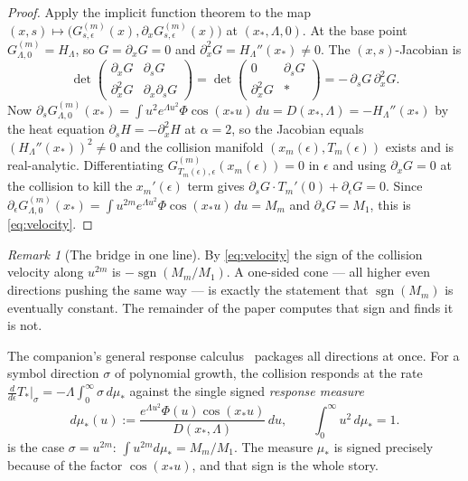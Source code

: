 \documentclass[11pt,reqno]{amsart}
\theoremstyle{plain}
\theoremstyle{definition}
\theoremstyle{remark}
\newtheorem{remark}[theorem]{Remark}
\DeclareMathOperator{\sgn}{sgn}
\begin{document}
\begin{proof}
Apply the implicit function theorem to the map
$(x,s)\mapsto\bigl(G^{(m)}_{s,\epsilon}(x),\partial_xG^{(m)}_{s,\epsilon}(x)\bigr)$
at $(x_*,\Lambda,0)$. At the base point $G^{(m)}_{\Lambda,0}=H_\Lambda$, so
$G=\partial_xG=0$ and $\partial_x^2G=H_\Lambda''(x_*)\neq0$. The
$(x,s)$-Jacobian is
\[
  \det\begin{pmatrix}\partial_xG & \partial_sG\\
  \partial_x^2G & \partial_x\partial_sG\end{pmatrix}
  =\det\begin{pmatrix}0 & \partial_sG\\ \partial_x^2G & *\end{pmatrix}
  =-\,\partial_sG\,\partial_x^2G .
\]
Now $\partial_sG^{(m)}_{\Lambda,0}(x_*)=\int u^2e^{\Lambda u^2}\Phi\cos(x_*u)\,du
=D(x_*,\Lambda)=-H_\Lambda''(x_*)$ by the heat equation
$\partial_sH=-\partial_x^2H$ at $\alpha=2$, so the Jacobian equals
$(H_\Lambda''(x_*))^2\neq0$ and the collision manifold
$(x_m(\epsilon),T_m(\epsilon))$ exists and is real-analytic. Differentiating
$G^{(m)}_{T_m(\epsilon),\epsilon}(x_m(\epsilon))=0$ in $\epsilon$ and using
$\partial_xG=0$ at the collision to kill the $x_m'(\epsilon)$ term gives
$\partial_sG\cdot T_m'(0)+\partial_\epsilon G=0$. Since
$\partial_\epsilon G^{(m)}_{\Lambda,0}(x_*)=\int u^{2m}e^{\Lambda u^2}\Phi
\cos(x_*u)\,du=M_m$ and $\partial_sG=M_1$, this is \eqref{eq:velocity}.
\end{proof}

\begin{remark}[The bridge in one line]\label{rem:bridge}
By \eqref{eq:velocity} the sign of the collision velocity along $u^{2m}$ is
$-\sgn(M_m/M_1)$. A one-sided cone --- all higher even directions pushing
the same way --- is exactly the statement that $\sgn(M_m)$ is eventually
constant. The remainder of the paper computes that sign and finds it is
not.
\end{remark}

The companion's general response calculus~\cite{Fsymbol} packages all
directions at once. For a symbol direction $\sigma$ of polynomial growth,
the collision responds at the rate
$\frac{d}{d\epsilon}T_*|_\sigma=-\Lambda\int_0^\infty\sigma\,d\mu_*$ against
the single signed \emph{response measure}
\begin{equation}\label{eq:mustar}
  d\mu_*(u):=\frac{e^{\Lambda u^2}\Phi(u)\cos(x_*u)}{D(x_*,\Lambda)}\,du,
  \qquad \int_0^\infty u^2\,d\mu_*=1 .
\end{equation}
 is the case $\sigma=u^{2m}$:
$\int u^{2m}d\mu_*=M_m/M_1$. The measure $\mu_*$ is signed precisely because
of the factor $\cos(x_*u)$, and that sign is the whole story.
\end{document}
